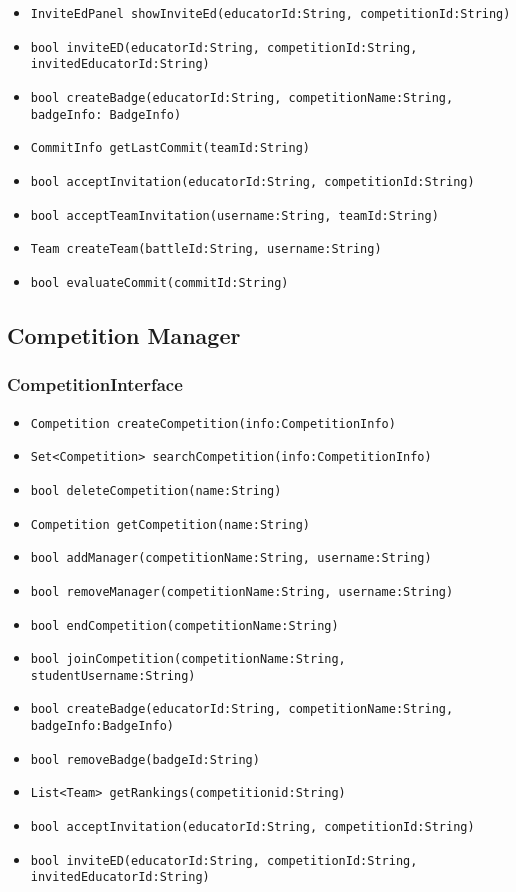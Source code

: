 \begin{itemize}
    \item \texttt{InviteEdPanel showInviteEd(educatorId:String, competitionId:String)}%
    \item \texttt{bool inviteED(educatorId:String, competitionId:String, invitedEducatorId:String)}%
    \item \texttt{bool createBadge(educatorId:String, competitionName:String, badgeInfo: BadgeInfo)}%
    \item \texttt{CommitInfo getLastCommit(teamId:String)}%
    \item \texttt{bool acceptInvitation(educatorId:String, competitionId:String)}%
    \item \texttt{bool acceptTeamInvitation(username:String, teamId:String)}%
    \item \texttt{Team createTeam(battleId:String, username:String)}%
    \item \texttt{bool evaluateCommit(commitId:String)}%
\end{itemize}

\subsection{Competition Manager}
\subsubsection{CompetitionInterface}
\begin{itemize}
    \item \texttt{Competition createCompetition(info:CompetitionInfo)}%
    \item \texttt{Set<Competition> searchCompetition(info:CompetitionInfo)}
    \item \texttt{bool deleteCompetition(name:String)}
    \item \texttt{Competition getCompetition(name:String)}%
    \item \texttt{bool addManager(competitionName:String, username:String)}%
    \item \texttt{bool removeManager(competitionName:String, username:String)}
    \item \texttt{bool endCompetition(competitionName:String)}
    \item \texttt{bool joinCompetition(competitionName:String, studentUsername:String)}%
    \item \texttt{bool createBadge(educatorId:String, competitionName:String,\\badgeInfo:BadgeInfo)}%
    \item \texttt{bool removeBadge(badgeId:String)}
    \item \texttt{List<Team> getRankings(competitionid:String)}
    \item \texttt{bool acceptInvitation(educatorId:String, competitionId:String)}%
    \item \texttt{bool inviteED(educatorId:String, competitionId:String,\\invitedEducatorId:String)}%
\end{itemize}

